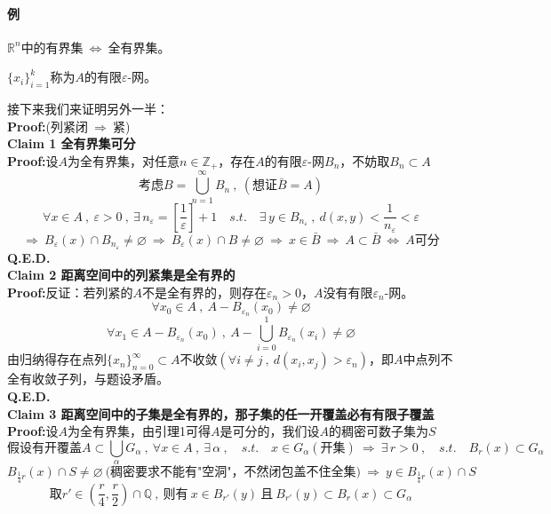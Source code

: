 \paragraph*{例} \quad $\mathbb{R}^n$中的有界集$\ \Leftrightarrow \ $全有界集。
\begin{definition}[有限$\varepsilon$-网]
    $\{x_i\}_{i=1}^k$称为$A$的有限$\varepsilon$-网。
\end{definition}
接下来我们来证明另外一半：\\
\textbf{Proof:}(列紧闭$ \ \Rightarrow \ $紧)\\
\textbf{Claim 1 全有界集可分}\\
\textbf{Proof:}设$A$为全有界集，对任意$n \in \mathbb{Z}_+$，存在$A$的有限$\varepsilon$-网$B_n$，不妨取$B_n \subset A$
\[\text{考虑}B=\bigcup_{n=1}^{\infty}B_n \ , \ (\text{想证}\bar{B}=A)\]
\[\forall x \in A \ , \ \varepsilon>0 \ , \ \exists \, n_{\varepsilon}=\left[\frac{1}{\varepsilon}\right]+1 \quad s.t. \quad \exists \, y \in B_{n_{\varepsilon}} \ , \ d(x,y)<\frac{1}{n_{\varepsilon}}<\varepsilon\]
\[\Rightarrow \ B_{\varepsilon}(x) \cap B_{n_{\varepsilon}} \neq \varnothing \ \Rightarrow \ B_{\varepsilon}(x) \cap B \neq \varnothing \ \Rightarrow \ x \in \bar{B} \ \Rightarrow \ A \subset \bar{B} \ \Leftrightarrow \ A\text{可分}\]
\textbf{Q.E.D.}\\
\textbf{Claim 2 距离空间中的列紧集是全有界的}\\
\textbf{Proof:}反证：若列紧的$A$不是全有界的，则存在$\varepsilon_n>0$，$A$没有有限$\varepsilon_n$-网。
\[\forall x_0 \in A \ , \ A-B_{\varepsilon_n}(x_0) \neq \varnothing\]
\[\forall x_1 \in A-B_{\varepsilon_n}(x_0) \ , \ A-\bigcup_{i=0}^1B_{\varepsilon_n}(x_i) \neq \varnothing\]
由归纳得存在点列$\{x_n\}_{n=0}^{\infty} \subset A$不收敛$(\forall i \neq j \ , \ d(x_i,x_j)>\varepsilon_n)$，即$A$中点列不全有收敛子列，与题设矛盾。\\
\textbf{Q.E.D.}\\
\textbf{Claim 3 距离空间中的子集是全有界的，那子集的任一开覆盖必有有限子覆盖}\\
\textbf{Proof:}设$A$为全有界集，由引理1可得$A$是可分的，我们设$A$的稠密可数子集为$S$
\[\text{假设有开覆盖}A \subset \bigcup_{\alpha}G_{\alpha} \ , \ \forall x \in A \ , \ \exists \, \alpha \ , \quad s.t. \quad x \in G_{\alpha}(\text{开集}) \ \Rightarrow \ \exists \,r>0 \ , \quad s.t. \quad B_r(x) \subset G_{\alpha}\]
\[B_{\frac{1}{4}r}(x) \cap S \neq \varnothing \ \text{(稠密要求不能有"空洞"，不然闭包盖不住全集)} \ \Rightarrow \ y \in B_{\frac{1}{4}r}(x) \cap S\]
\[\text{取}r' \in \left(\frac{r}{4},\frac{r}{2}\right) \cap \mathbb{Q} \ , \ \text{则有} \ x \in B_{r'}(y) \ \text{且} \ B_{r'}(y) \subset B_{r}(x) \subset G_{\alpha}\]
